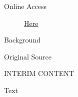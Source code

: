 			\begin{description}
				\item[Online Access] \href{https://www.josephsmithpapers.org/paper-summary/discourse-25-february-1843/1}{Here}
			\end{description}
			
			\begin{description}
				\item[Background]
			\end{description}
			
			
			\begin{description}
				\item[Original Source]
			\end{description}
			
				INTERIM CONTENT
			
			
			\begin{description}
				\item[Text]
			\end{description}
			
